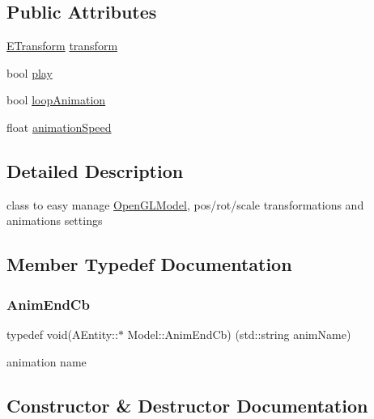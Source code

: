 \subsection*{Public Attributes}
\begin{DoxyCompactItemize}
\item 
\hyperlink{class_e_transform}{E\+Transform} \hyperlink{class_model_a7b63d1be0afb6c145d1b97ac58a23a3a}{transform}
\item 
bool \hyperlink{class_model_aab41c5353b398ca56cc3e42724b02272}{play}
\item 
bool \hyperlink{class_model_a1c1708f7513a39355120dc7428309e9e}{loop\+Animation}
\item 
float \hyperlink{class_model_a042a27427c802b5a7a6cee4a6ec07897}{animation\+Speed}
\end{DoxyCompactItemize}


\subsection{Detailed Description}
class to easy manage \hyperlink{class_open_g_l_model}{Open\+G\+L\+Model}, pos/rot/scale transformations and animations settings 

\subsection{Member Typedef Documentation}
\mbox{\label{class_model_a10bbf272d503c30923993e5a5ac45bed}} 
\subsubsection{\texorpdfstring{Anim\+End\+Cb}{AnimEndCb}}
{\footnotesize\ttfamily typedef void(A\+Entity\+::$\ast$ Model\+::\+Anim\+End\+Cb) (std\+::string anim\+Name)}

animation name 

\subsection{Constructor \& Destructor Documentation}
\mbox{\label{class_model_abd566d0030ea6d854f110498b0c774a2}} 
